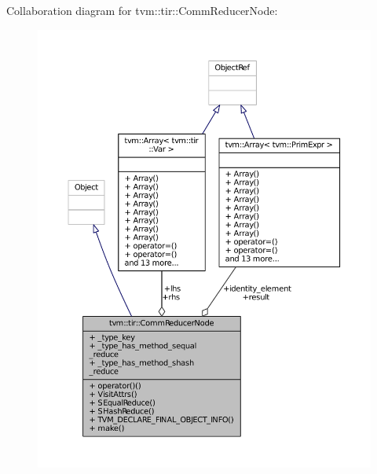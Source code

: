Collaboration diagram for tvm\+:\+:tir\+:\+:Comm\+Reducer\+Node\+:
\nopagebreak
\begin{figure}[H]
\begin{center}
\leavevmode
\includegraphics[width=350pt]{classtvm_1_1tir_1_1CommReducerNode__coll__graph}
\end{center}
\end{figure}
